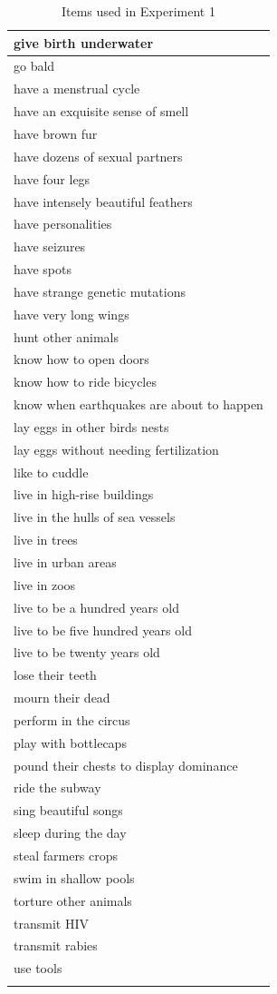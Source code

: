 \documentclass[floatsintext,doc]{apa6}
\begin{document}
\begin{longtable}{ |p{3in}|}
   \hline
give birth underwater \\ 
   \hline
go bald \\ 
   \hline
have a menstrual cycle \\ 
   \hline
have an exquisite sense of smell \\ 
   \hline
have brown fur \\ 
   \hline
have dozens of sexual partners \\ 
   \hline
have four legs \\ 
   \hline
have intensely beautiful feathers \\ 
   \hline
have personalities \\ 
   \hline
have seizures \\ 
   \hline
have spots \\ 
   \hline
have strange genetic mutations \\ 
   \hline
have very long wings \\ 
   \hline
hunt other animals \\ 
   \hline
know how to open doors \\ 
   \hline
know how to ride bicycles \\ 
   \hline
know when earthquakes are about to happen \\ 
   \hline
lay eggs in other birds nests \\ 
   \hline
lay eggs without needing fertilization \\ 
   \hline
like to cuddle \\ 
   \hline
live in high-rise buildings \\ 
   \hline
live in the hulls of sea vessels \\ 
   \hline
live in trees \\ 
   \hline
live in urban areas \\ 
   \hline
live in zoos \\ 
   \hline
live to be a hundred years old \\ 
   \hline
live to be five hundred years old \\ 
   \hline
live to be twenty years old \\ 
   \hline
lose their teeth \\ 
   \hline
mourn their dead \\ 
   \hline
perform in the circus \\ 
   \hline
play with bottlecaps \\ 
   \hline
pound their chests to display dominance \\ 
   \hline
ride the subway \\ 
   \hline
sing beautiful songs \\ 
   \hline
sleep during the day \\ 
   \hline
steal farmers crops \\ 
   \hline
swim in shallow pools \\ 
   \hline
torture other animals \\ 
   \hline
transmit HIV \\ 
   \hline
transmit rabies \\ 
   \hline
use tools \\ 
   \hline
\hline
\caption{Items used in Experiment 1} 
\end{longtable}
\end{document}
